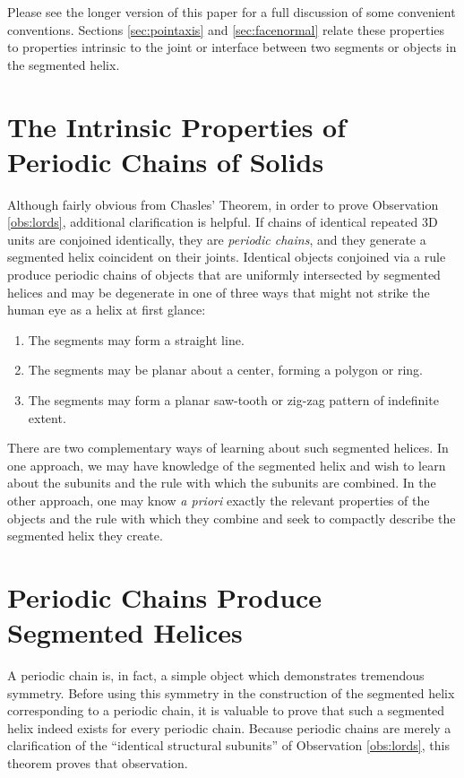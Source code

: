 \documentclass{svproc}
\begin{document}
Please see the longer version of this paper for a full discussion
of some convenient conventions.
Sections \ref{sec:pointaxis} and \ref{sec:facenormal}
relate these properties to properties intrinsic to the joint or interface between
two segments or objects in the segmented helix.

\label{sec:SegmentedHelix}

\section{The Intrinsic Properties of Periodic Chains of Solids}

Although fairly obvious from Chasles' Theorem, in order to prove Observation \ref{obs:lords},
additional clarification is helpful.
If chains of identical repeated 3D units are conjoined identically, they are {\em periodic chains},
and they generate a segmented helix coincident on their joints.
Identical objects conjoined via a rule
produce periodic chains of objects that are uniformly intersected
by segmented helices and may be degenerate in one of
three ways that might not strike the human eye as a helix at first glance:
\begin{enumerate}
\item The segments may form a straight line.
\item The segments may be planar about a center, forming a polygon or ring.
\item The segments may form a planar saw-tooth or zig-zag pattern of indefinite extent.
\end{enumerate}

There are two complementary ways of learning about such segmented helices.
In one approach, we may have knowledge of the segmented helix and
wish to learn about the subunits and the rule with which the subunits are combined.
In the other approach, one may know {\it a priori} exactly the
relevant properties of the objects and the rule with which they combine
and seek to compactly describe the segmented helix they create.

\section{Periodic Chains Produce Segmented Helices}

A periodic chain is, in fact, a simple object which demonstrates tremendous symmetry.
Before using this symmetry in the construction of the segmented helix corresponding to a periodic chain,
it is valuable to
prove that such a segmented helix indeed exists for every periodic chain.
Because periodic chains are merely a clarification of the ``identical structural subunits''
of Observation \ref{obs:lords},
this theorem proves that observation.
\end{document}
